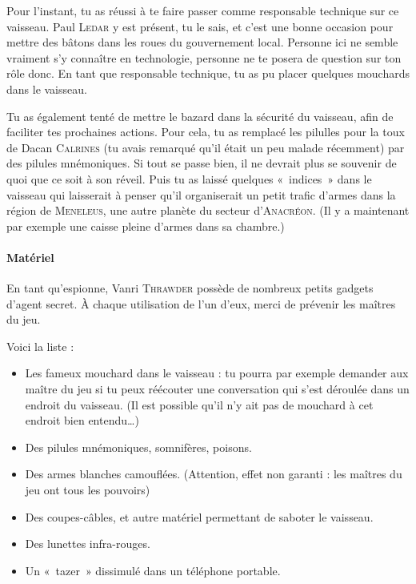 \documentclass{article}
\begin{document}
{Pour l’instant, tu as réussi à te faire passer comme responsable technique sur ce vaisseau.
Paul \textsc{Ledar} y est présent, tu le sais, et c’est une bonne occasion pour mettre des bâtons dans les roues du gouvernement local.
Personne ici ne semble vraiment s’y connaître en technologie, personne ne te posera de question sur ton rôle donc.
En tant que responsable technique, tu as pu placer quelques mouchards dans le vaisseau.

Tu as également tenté de mettre le bazard dans la sécurité du vaisseau, afin de faciliter tes prochaines actions.
Pour cela, tu as remplacé les pilulles pour la toux de Dacan \textsc{Calrines} (tu avais remarqué qu’il était un peu malade récemment) par des pilules mnémoniques.
Si tout se passe bien, il ne devrait plus se souvenir de quoi que ce soit à son réveil.
Puis tu as laissé quelques «~indices~» dans le vaisseau qui laisserait à penser qu’il organiserait un petit trafic d’armes dans la région de \textsc{Meneleus}, une autre planète du secteur d’\textsc{Anacréon}.
(Il y a maintenant par exemple une caisse pleine d’armes dans sa chambre.)

\paragraph{Matériel}
{
En tant qu’espionne, Vanri \textsc{Thrawder} possède de nombreux petits gadgets d’agent secret.
À chaque utilisation de l’un d’eux, merci de prévenir les maîtres du jeu.

Voici la liste :
\begin{itemize}
	\item Les fameux mouchard dans le vaisseau : tu pourra par exemple demander aux maître du jeu si tu peux réécouter une conversation qui s’est déroulée dans un endroit du vaisseau. (Il est possible qu’il n’y ait pas de mouchard à cet endroit bien entendu…)
	\item Des pilules mnémoniques, somnifères, poisons.
	\item Des armes blanches camouflées. (Attention, effet non garanti : les maîtres du jeu ont tous les pouvoirs)
	\item Des coupes-câbles, et autre matériel permettant de saboter le vaisseau.
	\item Des lunettes infra-rouges.
	\item Un «~tazer~» dissimulé dans un téléphone portable.
\end{itemize}
}
}
\end{document}
